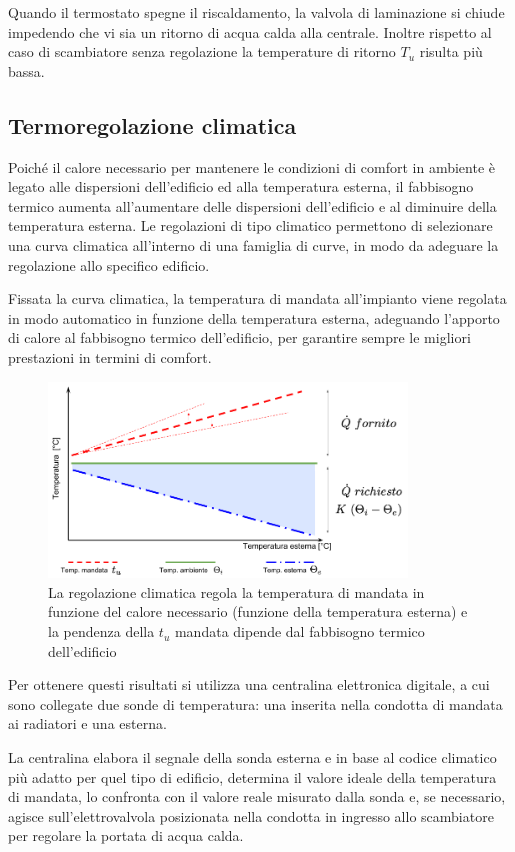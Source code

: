 \documentclass[laurea,oneside,11pt]{USiena_tesiLM3}
\begin{document}
Quando il termostato spegne il riscaldamento, la valvola di laminazione si chiude impedendo che vi sia un ritorno di acqua calda alla centrale. Inoltre rispetto al caso di scambiatore senza regolazione la temperature di ritorno $T_u$ risulta più bassa.


\subsection{Termoregolazione climatica}
Poiché il calore necessario per mantenere le condizioni di comfort in ambiente è legato alle dispersioni dell'edificio ed alla temperatura esterna, il fabbisogno termico aumenta all'aumentare delle dispersioni dell'edificio e al diminuire della temperatura esterna. Le regolazioni di tipo climatico permettono di selezionare una curva climatica all'interno di una famiglia di curve, in modo da adeguare la regolazione allo specifico edificio. 

Fissata la curva climatica, la temperatura di mandata all'impianto viene regolata in modo automatico in funzione della temperatura esterna, adeguando l'apporto di calore al fabbisogno termico dell'edificio, per garantire sempre le migliori prestazioni in termini di comfort. 

\begin{figure}[!ht]
\centering
\includegraphics[width=0.85\textwidth]{figure/climatica} 
\caption{La regolazione climatica regola la temperatura di mandata in funzione del calore necessario (funzione della temperatura esterna) e la pendenza della $t_u$ mandata dipende dal fabbisogno termico dell'edificio}
\label{fig:surplus}
\end{figure}

Per ottenere questi risultati si utilizza una centralina elettronica digitale, a cui sono collegate due sonde di temperatura: una inserita nella condotta di mandata ai radiatori e una esterna. 

La centralina elabora il segnale della sonda esterna e in base al codice climatico più adatto per quel tipo di edificio, determina il valore ideale della temperatura di mandata, lo confronta con il valore reale misurato dalla sonda e, se necessario, agisce sull'elettrovalvola posizionata nella condotta in ingresso allo scambiatore per regolare la portata di acqua calda.
\end{document}
